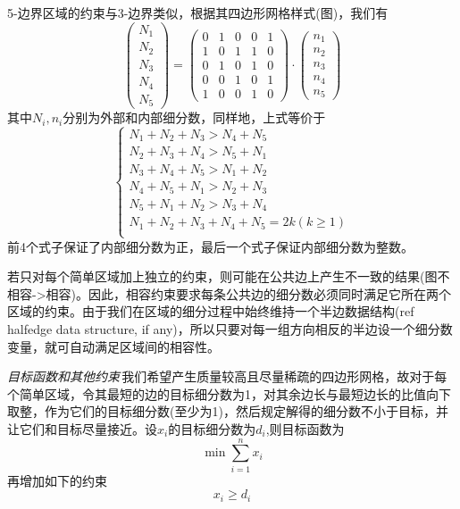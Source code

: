  5-边界区域的约束与3-边界类似，根据其四边形网格样式(图)，我们有
 \begin{equation}
 \left(
 \begin{array}{c}
 N_1 \\ 
 N_2 \\ 
 N_3 \\
 N_4 \\
 N_5
 \end{array}
 \right) 
 =
 \left(
 \begin{array}{ccccc}
 0 & 1 & 0 & 0 & 1 \\ 
 1 & 0 & 1 & 1 & 0 \\ 
 0 & 1 & 0 & 1 & 0 \\ 
 0 & 0 & 1 & 0 & 1 \\ 
 1 & 0 & 0 & 1 & 0
 \end{array} 
 \right)
 \cdot
 \left(
 \begin{array}{c}
 n_1 \\ 
 n_2 \\ 
 n_3 \\ 
 n_4 \\
 n_5 
 \end{array} 
 \right)
 \end{equation}
 其中$N_i,n_i$分别为外部和内部细分数，同样地，上式等价于
 \begin{equation}        \label{equ:5side}                  
 \begin{cases}
 N_1+N_2+N_3 > N_4+N_5\\
N_2+N_3+N_4 > N_5+N_1\\
 N_3+N_4+N_5 > N_1+N_2\\
N_4+N_5+N_1 > N_2+N_3\\
N_5+N_1+N_2 > N_3+N_4\\
N_1+N_2+N_3+N_4+N_5=2k(k\geq 1)\\
 \end{cases}
 \end{equation}
 前4个式子保证了内部细分数为正，最后一个式子保证内部细分数为整数。
 
若只对每个简单区域加上独立的约束，则可能在公共边上产生不一致的结果(图不相容->相容)。因此，相容约束要求每条公共边的细分数必须同时满足它所在两个区域的约束。由于我们在区域的细分过程中始终维持一个半边数据结构(ref halfedge data structure, if any)，所以只要对每一组方向相反的半边设一个细分数变量，就可自动满足区域间的相容性。

\emph{目标函数和其他约束}\,我们希望产生质量较高且尽量稀疏的四边形网格，故对于每个简单区域，令其最短的边的目标细分数为1，对其余边长与最短边长的比值向下取整，作为它们的目标细分数(至少为1)，然后规定解得的细分数不小于目标，并让它们和目标尽量接近。设$x_i$的目标细分数为$d_i$,则目标函数为
\begin{equation}\label{equ:targetf}
\min \sum_{i=1}^{n} x_i
\end{equation}
再增加如下的约束
\begin{equation} \label{equ:target-constrain}
x_i \geq d_i
\end{equation}

